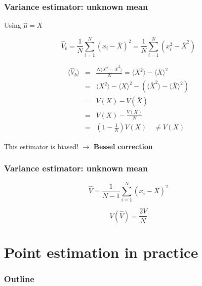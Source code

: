 \documentclass[9pt]{beamer}
\newif\ifmynote
\newif\ifmyhide
\newcommand\mynote[1]{%
\ifmynote \textbf{#1} \else \fi
}
\newcommand\myhide[1]{%
\ifmyhide \vspace{15pt} \begin{center} \myexample{(blackboard)}\end{center} \vspace{15pt} \else #1 \fi
}
\begin{document}
\begin{frame}
 \frametitle{Variance estimator: unknown mean}
 
 \myhide{
 Using $\hat{\mu} = \bar{X}$
 
 $$\hat{V}_b = \frac{1}{N} \sum_{i=1}^N (x_i-\bar{X})^2 = \frac{1}{N} \sum_{i=1}^N (x_i^2 - \bar{X}^2)$$
 
 \begin{eqnarray}
  \langle \hat{V}_b \rangle & = & \frac{N \langle X^2 - \bar{X}^2 \rangle}{N} = \langle X^2 \rangle - \langle \bar{X} \rangle^2 \nonumber \\
  & = & \langle X^2 \rangle - \langle X \rangle^2 - \left( \langle \bar{X}^2 \rangle - \langle \bar{X} \rangle ^2 \right) \nonumber \\
  & = & V(X) - V(\bar{X}) \nonumber \\
  & = & V(X) - \frac{V(X)}{N} \nonumber \\
  & = & \left( 1 - \frac{1}{N} \right) V(X)\quad \neq V(X) \nonumber
 \end{eqnarray}
 
 This estimator is biased! $\rightarrow$ \textbf{Bessel correction}
 }

\end{frame}

\begin{frame}
 \frametitle{Variance estimator: unknown mean}
 
 \mynote{Écrire d'abord au tableau}

 \begin{block}{}
  $$\hat{V} = \frac{1}{N-1} \sum_{i=1}^N (x_i - \bar{X})^2$$
 \end{block}
 
 $$V(\hat{V}) = \frac{2V}{N}$$

\end{frame}

\section{Point estimation in practice}

\begin{frame}
 \frametitle{Outline}
 
 \tableofcontents[current]
\end{frame}
\end{document}
